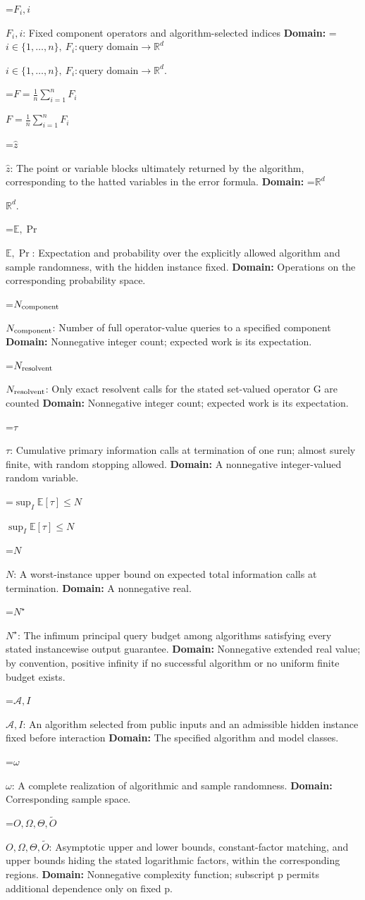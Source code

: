 \documentclass[10pt,a4paper]{article}
\newcommand{\AtlasMath}[1]{\par\begingroup\centering\setbox0=\hbox{$\displaystyle #1$}\ifdim\wd0>1.4\linewidth\typeout{ATLAS WIDE FORMULA: \the\wd0}\fi\ifdim\wd0>\linewidth\resizebox{\linewidth}{!}{\box0}\else\box0\fi\par\endgroup}
\newcommand{\AtlasInlineMath}[1]{\begingroup\setbox0=\hbox{$#1$}\ifdim\wd0>.4\linewidth\endgroup\AtlasMath{#1}\else\endgroup$#1$\fi}
\begin{document}
\AtlasInlineMath{F_i,i}: Fixed component operators and algorithm-selected indices \textbf{Domain:} \AtlasInlineMath{i\in\{1,\ldots,n\},\ F_i:\text{query domain}\to\mathbb R^d}.

\AtlasInlineMath{F=\frac1n\sum_{i=1}^n F_i}

\AtlasInlineMath{\widehat z}: The point or variable blocks ultimately returned by the algorithm, corresponding to the hatted variables in the error formula. \textbf{Domain:} \AtlasInlineMath{\mathbb R^d}.

\AtlasInlineMath{\mathbb E,\Pr}: Expectation and probability over the explicitly allowed algorithm and sample randomness, with the hidden instance fixed. \textbf{Domain:} Operations on the corresponding probability space.

\AtlasInlineMath{N_{\rm component}}: Number of full operator-value queries to a specified component \textbf{Domain:} Nonnegative integer count; expected work is its expectation.

\AtlasInlineMath{N_{\rm resolvent}}: Only exact resolvent calls for the stated set-valued operator G are counted \textbf{Domain:} Nonnegative integer count; expected work is its expectation.

\AtlasInlineMath{\tau}: Cumulative primary information calls at termination of one run; almost surely finite, with random stopping allowed. \textbf{Domain:} A nonnegative integer-valued random variable.

\AtlasInlineMath{\sup_I\mathbb E[\tau]\le N}

\AtlasInlineMath{N}: A worst-instance upper bound on expected total information calls at termination. \textbf{Domain:} A nonnegative real.

\AtlasInlineMath{N^\star}: The infimum principal query budget among algorithms satisfying every stated instancewise output guarantee. \textbf{Domain:} Nonnegative extended real value; by convention, positive infinity if no successful algorithm or no uniform finite budget exists.

\AtlasInlineMath{\mathcal A,I}: An algorithm selected from public inputs and an admissible hidden instance fixed before interaction \textbf{Domain:} The specified algorithm and model classes.

\AtlasInlineMath{\omega}: A complete realization of algorithmic and sample randomness. \textbf{Domain:} Corresponding sample space.

\AtlasInlineMath{O,\Omega,\Theta,\widetilde O}: Asymptotic upper and lower bounds, constant-factor matching, and upper bounds hiding the stated logarithmic factors, within the corresponding regions. \textbf{Domain:} Nonnegative complexity function; subscript p permits additional dependence only on fixed p.
\end{document}
